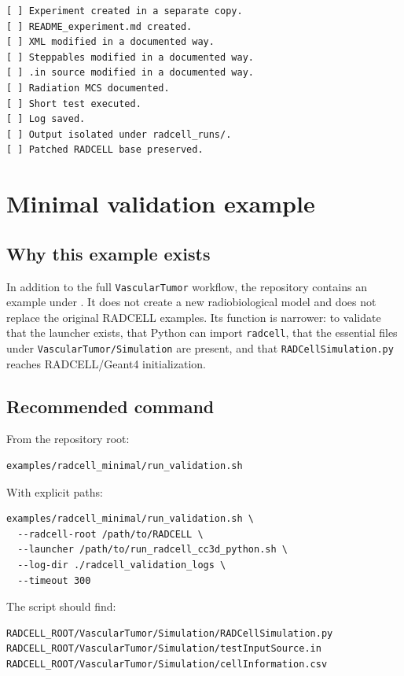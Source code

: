 \documentclass[11pt,a4paper,twoside,pdftex]{refrep}
\begin{document}
\begin{lstlisting}
[ ] Experiment created in a separate copy.
[ ] README_experiment.md created.
[ ] XML modified in a documented way.
[ ] Steppables modified in a documented way.
[ ] .in source modified in a documented way.
[ ] Radiation MCS documented.
[ ] Short test executed.
[ ] Log saved.
[ ] Output isolated under radcell_runs/.
[ ] Patched RADCELL base preserved.
\end{lstlisting}

\chapter{Minimal validation example}

\section{Why this example exists}

In addition to the full \texttt{VascularTumor} workflow, the repository contains an example under . It does not create a new radiobiological model and does not replace the original RADCELL examples. Its function is narrower: to validate that the launcher exists, that Python can import \texttt{radcell}, that the essential files under \texttt{VascularTumor/Simulation} are present, and that \texttt{RADCellSimulation.py} reaches RADCELL/Geant4 initialization.

\section{Recommended command}

From the repository root:

\begin{lstlisting}
examples/radcell_minimal/run_validation.sh
\end{lstlisting}

With explicit paths:

\begin{lstlisting}
examples/radcell_minimal/run_validation.sh \
  --radcell-root /path/to/RADCELL \
  --launcher /path/to/run_radcell_cc3d_python.sh \
  --log-dir ./radcell_validation_logs \
  --timeout 300
\end{lstlisting}

The script should find:

\begin{lstlisting}
RADCELL_ROOT/VascularTumor/Simulation/RADCellSimulation.py
RADCELL_ROOT/VascularTumor/Simulation/testInputSource.in
RADCELL_ROOT/VascularTumor/Simulation/cellInformation.csv
\end{lstlisting}
\end{document}
